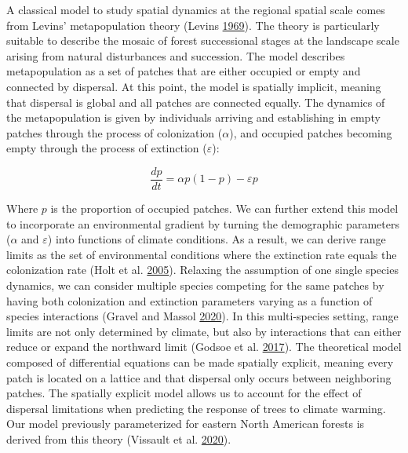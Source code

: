 \documentclass[12pt]{article}
\begin{document}
A classical model to study spatial dynamics at the regional spatial
scale comes from Levins' metapopulation theory (Levins
\protect\hyperlink{ref-Levins1969}{1969}). The theory is particularly
suitable to describe the mosaic of forest successional stages at the
landscape scale arising from natural disturbances and succession. The
model describes metapopulation as a set of patches that are either
occupied or empty and connected by dispersal. At this point, the model
is spatially implicit, meaning that dispersal is global and all patches
are connected equally. The dynamics of the metapopulation is given by
individuals arriving and establishing in empty patches through the
process of colonization (\(\alpha\)), and occupied patches becoming
empty through the process of extinction (\(\varepsilon\)):

\[
\frac{dp}{dt} = \alpha p (1 - p) - \varepsilon p
\]

Where \(p\) is the proportion of occupied patches. We can further extend
this model to incorporate an environmental gradient by turning the
demographic parameters (\(\alpha\) and \(\varepsilon\)) into functions
of climate conditions. As a result, we can derive range limits as the
set of environmental conditions where the extinction rate equals the
colonization rate (Holt et al. \protect\hyperlink{ref-Holt2005}{2005}).
Relaxing the assumption of one single species dynamics, we can consider
multiple species competing for the same patches by having both
colonization and extinction parameters varying as a function of species
interactions (Gravel and Massol
\protect\hyperlink{ref-Gravel2020}{2020}). In this multi-species
setting, range limits are not only determined by climate, but also by
interactions that can either reduce or expand the northward limit
(Godsoe et al. \protect\hyperlink{ref-Godsoe2017}{2017}). The
theoretical model composed of differential equations can be made
spatially explicit, meaning every patch is located on a lattice and that
dispersal only occurs between neighboring patches. The spatially
explicit model allows us to account for the effect of dispersal
limitations when predicting the response of trees to climate warming.
Our model previously parameterized for eastern North American forests is
derived from this theory (Vissault et al.
\protect\hyperlink{ref-Vissault2020}{2020}).
\end{document}
